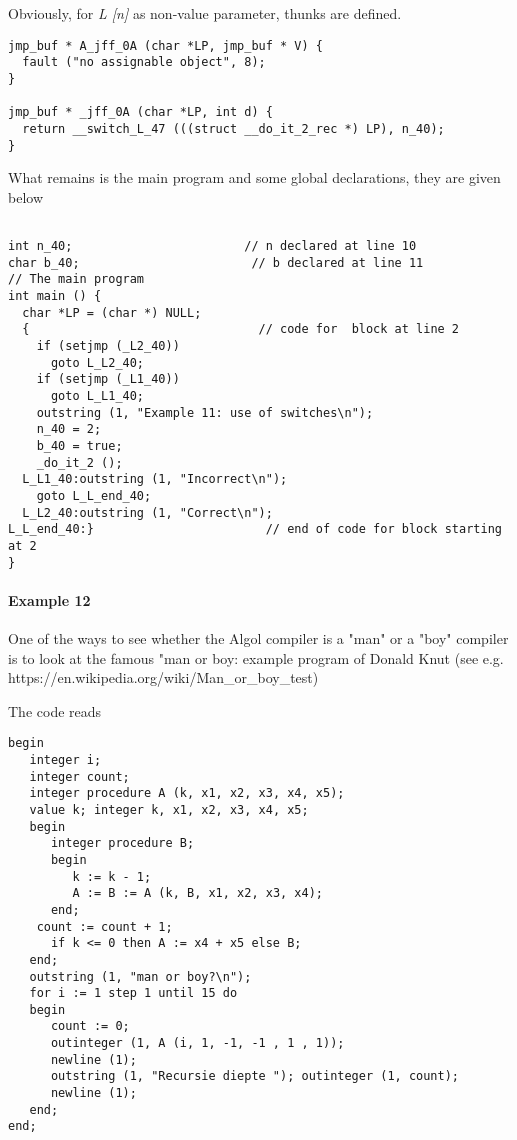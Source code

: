 \documentclass[11pt]{article}
\begin{document}
Obviously, for {\em L [n]} as non-value parameter, thunks are defined.
{\footnotesize
\begin{verbatim}
jmp_buf * A_jff_0A (char *LP, jmp_buf * V) {
  fault ("no assignable object", 8);
}

jmp_buf * _jff_0A (char *LP, int d) {
  return __switch_L_47 (((struct __do_it_2_rec *) LP), n_40);
}
\end{verbatim}
}
What remains is the main program and some global declarations, they are
given below
{\footnotesize
\begin{verbatim}

int n_40;                        // n declared at line 10
char b_40;                        // b declared at line 11
// The main program
int main () {
  char *LP = (char *) NULL;
  {                                // code for  block at line 2 
    if (setjmp (_L2_40))
      goto L_L2_40;
    if (setjmp (_L1_40))
      goto L_L1_40;
    outstring (1, "Example 11: use of switches\n");
    n_40 = 2;
    b_40 = true;
    _do_it_2 ();
  L_L1_40:outstring (1, "Incorrect\n");
    goto L_L_end_40;
  L_L2_40:outstring (1, "Correct\n");
L_L_end_40:}                        // end of code for block starting at 2
}
\end{verbatim}
}

\paragraph{Example 12}
One of the ways to see whether the Algol compiler is a "man" or a "boy"
compiler is to look at the famous "man or boy: example program of
Donald Knut (see  e.g. https://en.wikipedia.org/wiki/Man\_or\_boy\_test)

The code reads
{\small
\begin{verbatim}
begin
   integer i;
   integer count;
   integer procedure A (k, x1, x2, x3, x4, x5);
   value k; integer k, x1, x2, x3, x4, x5;
   begin
      integer procedure B;
      begin
         k := k - 1;
         A := B := A (k, B, x1, x2, x3, x4);
      end;
	count := count + 1;
      if k <= 0 then A := x4 + x5 else B;
   end;
   outstring (1, "man or boy?\n");
   for i := 1 step 1 until 15 do
   begin
      count := 0;
      outinteger (1, A (i, 1, -1, -1 , 1 , 1));
      newline (1);
      outstring (1, "Recursie diepte "); outinteger (1, count);
      newline (1);
   end;
end;
\end{verbatim}
}
\end{document}
